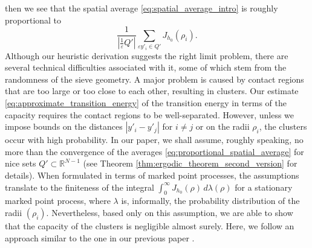 \documentclass{article}
\numberwithin{equation}{section}
\theoremstyle{definition}
\theoremstyle{remark}
\begin{document}
then we see that the spatial average \eqref{eq:spatial_average_intro} is roughly proportional to
\begin{equation} \label{eq:proportional_spatial_average}
    \frac{1}{\left|\frac{1}{\varepsilon} Q'\right|} \sum_{\varepsilon y'_i \in Q'} J_{h_0}(\rho_i).
\end{equation}
Although our heuristic derivation suggests the right limit problem, there are several technical difficulties associated with it, some of which stem from the randomness of the sieve geometry. A major problem is caused by contact regions that are too large or too close to each other, resulting in clusters. Our estimate \eqref{eq:approximate_transition_energy} of the transition energy in terms of the capacity requires the contact regions to be well-separated. However, unless we impose bounds on the distances $|y'_i - y'_j|$ for $i \neq j$ or on the radii $\rho_i$, the clusters occur with high probability. In our paper, we shall assume, roughly speaking, no more than the convergence of the averages \eqref{eq:proportional_spatial_average} for nice sets $Q' \subset \mathbb{R}^{N - 1}$ (see Theorem \ref{thm:ergodic_theorem_second_version} for details). When formulated in terms of marked point processes, the assumptions translate to the finiteness of the integral $\int_0^\infty J_{h_0}(\rho) \, d\lambda(\rho)$ for a stationary marked point process, where $\lambda$ is, informally, the probability distribution of the radii $(\rho_i)$. Nevertheless, based only on this assumption, we are able to show that the capacity of the clusters is negligible almost surely. Here, we follow an approach similar to the one in our previous paper \cite{B}.
\end{document}
